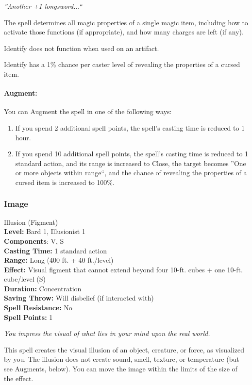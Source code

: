 \emph{''Another +1 longsword...``}

The spell determines all magic properties of a single magic item, including how to activate those functions (if appropriate), and how many charges are left (if any).

Identify does not function when used on an artifact.

Identify has a 1\% chance per caster level of revealing the properties of a cursed item.

\paragraph{Augment:} You can Augment the spell in one of the following ways:
\begin{enumerate}
 \item If you spend 2 additional spell points, the spell's casting time is reduced to 1 hour.
 \item If you spend 10 additional spell points, the spell's casting time is reduced to 1 standard action, and its range is increased to Close, 
 the target becomes ''One or more objects within range``, and the chance of revealing the properties of a cursed item is increased to 100\%.
\end{enumerate}

\subsubsection{Image}
\label{Spell:Image}
Illusion (Figment)
\\ \textbf{Level:} Bard 1, Illusionist 1
\\ \textbf{Components}: V, S
\\ \textbf{Casting Time:} 1 standard action
\\ \textbf{Range:} Long (400 ft. + 40 ft./level)
\\ \textbf{Effect:} Visual figment that cannot extend beyond four 10-ft. cubes + one 10-ft. cube/level (S)
\\ \textbf{Duration:} Concentration
\\ \textbf{Saving Throw:} Will disbelief (if interacted with)
\\ \textbf{Spell Resistance:} No
\\ \textbf{Spell Points:} 1

\emph{You impress the visual of what lies in your mind upon the real world.}

This spell creates the visual illusion of an object, creature, or force, as visualized by you. 
The illusion does not create sound, smell, texture, or temperature (but see Augments, below). 
You can move the image within the limits of the size of the effect.

